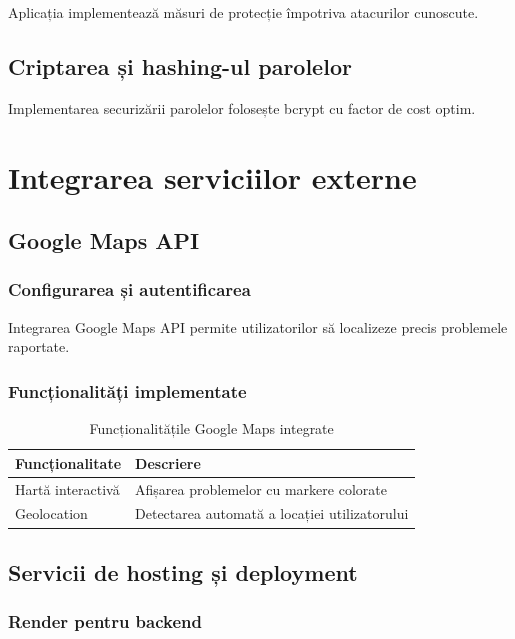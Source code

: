 \documentclass[12pt,a4paper]{report}
\begin{document}
Aplicația implementează măsuri de protecție împotriva atacurilor cunoscute.

\subsection{Criptarea și hashing-ul parolelor}

Implementarea securizării parolelor folosește bcrypt cu factor de cost optim.

\section{Integrarea serviciilor externe}

\subsection{Google Maps API}

\subsubsection{Configurarea și autentificarea}

Integrarea Google Maps API permite utilizatorilor să localizeze precis problemele raportate.

\subsubsection{Funcționalități implementate}

\begin{table}[H]
\centering
\caption{Funcționalitățile Google Maps integrate}
\label{tab:google_maps_features}
\begin{tabular}{|l|p{8cm}|}
\hline
\textbf{Funcționalitate} & \textbf{Descriere} \\
\hline
Hartă interactivă & Afișarea problemelor cu markere colorate \\
\hline
Geolocation & Detectarea automată a locației utilizatorului \\
\hline
\end{tabular}
\end{table}

\subsection{Servicii de hosting și deployment}

\subsubsection{Render pentru backend}
\end{document}
